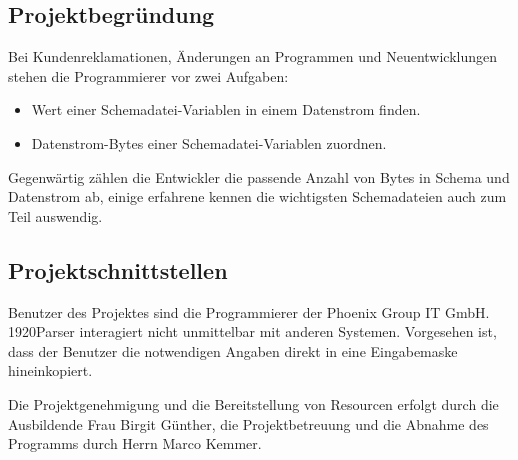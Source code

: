 \subsection{Projektbegründung}
\label{sec:Projektbegruendung}
Bei Kundenreklamationen, Änderungen an Programmen und Neuentwicklungen stehen die
Programmierer vor zwei Aufgaben:

\begin{itemize}
\item Wert einer Schemadatei-Variablen in einem Datenstrom finden.
\item Datenstrom-Bytes einer Schemadatei-Variablen zuordnen.
\end{itemize}

Gegenwärtig zählen die Entwickler die passende Anzahl von Bytes in Schema und Datenstrom ab, einige erfahrene kennen die wichtigsten Schemadateien auch zum Teil auswendig.


\subsection{Projektschnittstellen}
\label{sec:Projektschnittstellen}
Benutzer des Projektes sind die Programmierer der Phoenix Group IT GmbH.
1920Parser interagiert nicht unmittelbar mit anderen Systemen. Vorgesehen ist, dass der Benutzer die notwendigen Angaben direkt in eine Eingabemaske hineinkopiert.

Die Projektgenehmigung und die Bereitstellung von Resourcen erfolgt durch die Ausbildende Frau Birgit Günther, die Projektbetreuung und die Abnahme des Programms durch Herrn Marco Kemmer.

